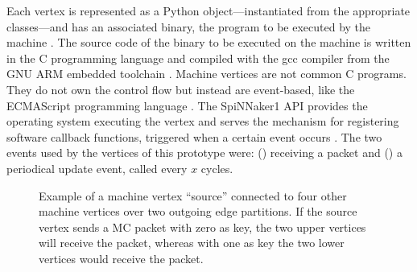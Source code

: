 \documentclass[]{article}
\begin{document}
Each vertex is represented as a Python object---instantiated from the
appropriate classes---and has an associated binary, the program to
be executed by the machine \citep{furber_et_al_2020}.
The source code of the binary to be executed on the machine is written
in the C programming language and compiled with the gcc compiler from
the GNU ARM embedded toolchain \citep{arm_2020, rowley_et_al_2019}.
Machine vertices are not common C programs.
They do not own the control flow but instead are event-based, like
the ECMAScript programming language \citep{ecma_2020}.
The SpiNNaker1 API provides the operating system executing the vertex
and serves the mechanism for registering software callback functions,
triggered when a certain event occurs \citep{furber_et_al_2020}.
The two events used by the vertices of this prototype were:
() receiving a packet and () a
periodical update event, called every $x$ cycles.

\begin{figure} %
\begin{center}
\end{center}
\caption{Example of a machine vertex ``source'' connected to four
  other machine vertices over two outgoing edge partitions. If the
  source vertex sends a MC packet with zero as key, the two upper
  vertices will receive the packet, whereas with one as key the two
  lower vertices would receive the packet.}
\label{fig:partitions}
\end{figure} %
\end{document}
